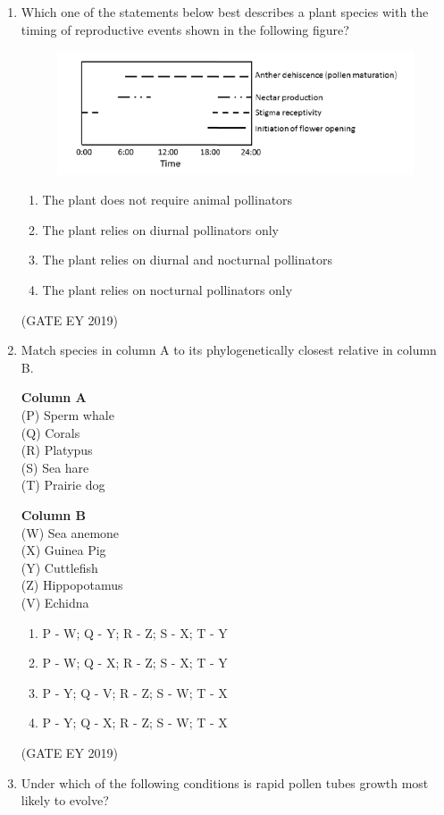 \documentclass[journal,12pt,onecolumn]{IEEEtran}
\theoremstyle{remark}
\begin{document}
\begin{enumerate}[resume]
\item Which one of the statements below best describes a plant species with the timing of reproductive events shown in the following figure?
\begin{figure}[H]
    \centering
    \includegraphics[]{figs/44.png}
\end{figure}

\begin{enumerate}
\item The plant does not require animal pollinators
\item The plant relies on diurnal pollinators only
\item The plant relies on diurnal and nocturnal pollinators
\item The plant relies on nocturnal pollinators only
\end{enumerate}


\hfill{(GATE EY 2019)}

\item Match species in column A to its phylogenetically closest relative in column B.

\begin{multicols}{2}
\textbf{Column A}\\
(P) Sperm whale\\
(Q) Corals\\
(R) Platypus\\
(S) Sea hare\\
(T) Prairie dog\\

\columnbreak

\textbf{Column B}\\
(W) Sea anemone\\
(X) Guinea Pig\\
(Y) Cuttlefish\\
(Z) Hippopotamus\\
(V) Echidna\\
\end{multicols}

\begin{multicols}{2}
\begin{enumerate}
\item P - W; Q - Y; R - Z; S - X; T - Y
\item P - W; Q - X; R - Z; S - X; T - Y
\item P - Y; Q - V; R - Z; S - W; T - X
\item P - Y; Q - X; R - Z; S - W; T - X
\end{enumerate}
\end{multicols}
\hfill{(GATE EY 2019)}
\item Under which of the following conditions is rapid pollen tubes growth most likely to evolve?



\end{enumerate}
\end{document}
